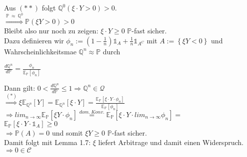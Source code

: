 \documentclass[envcountsame,envcountchap,envcountsect,amsart]{svmono}
\begin{document}
\begin{enumerate}
Aus $\left(**\right)$ folgt $\mathbb{Q}^0\left(\xi\cdot Y>0\right)>0$.\vspace*{.1cm}\\
$\stackrel{\mathbb{P}\ \approx\ \mathbb{Q}^0}\Longrightarrow \mathbb{P}\left(\xi Y>0\right)>0$\vspace*{.1cm}\\
Bleibt also nur noch zu zeigen: $\xi\cdot Y\geq 0$ $\mathbb{P}$-fast sicher.\vspace*{.1cm}\\
Dazu definieren wir $\phi_n:=\left(1-\frac{1}{n}\right)\mathds{1}_A+\frac{1}{n}\mathds{1}_{A^C}$ mit $A:=\left\{\xi Y< 0\right\}$ und Wahrscheinlichkeitsmae $\mathbb{Q}^n\approx\mathbb{P}$ durch
\begin{center}
$\frac{d\mathbb{Q}^n}{d\mathbb{P}}=\frac{\phi_n}{\mathbb{E}_{\mathbb{P}}\left[\phi_n\right]}$
\end{center}
Dann gilt: $0< \frac{d\mathbb{Q}^n}{d\mathbb{P}}\leq 1\Longrightarrow \mathbb{Q}^n\in\mathcal{Q}$\vspace*{.1cm}\\
$\stackrel{\left(*\right)}\Longrightarrow \xi\mathbb{E}_{\mathbb{Q}^n}\left[Y\right]=\mathbb{E}_{\mathbb{Q}^n}\left[\xi\cdot Y\right]=\frac{\mathbb{E}_{\mathbb{P}}\left[\xi\cdot Y\cdot \phi_n\right]}{\mathbb{E}_{\mathbb{P}}\left[ \phi_n\right]}$
\vspace*{.1cm}\\
$\Longrightarrow lim_{n\rightarrow\infty}\mathbb{E}_{\mathbb{P}}\left[\xi Y\cdot\phi_n\right]\stackrel{dom.\ Konv.}{=}\mathbb{E}_{\mathbb{P}}\left[\xi\cdot Y\cdot lim_{n\rightarrow\infty}\phi_n\right]=$\vspace*{.1cm}\\
$\mathbb{E}_{\mathbb{P}}\left[\xi\cdot Y\cdot\mathds{1}_A\right]\geq 0$\vspace*{.1cm}\\
$\Longrightarrow \mathbb{P}\left(A\right)=0$ und somit $\xi Y\geq 0$ $\mathbb{P}$-fast sicher.\vspace*{.1cm}\\
Damit folgt mit Lemma 1.7: $\xi$ liefert Arbitrage und damit einen Widerspruch.\vspace*{.1cm}\\
$\Rightarrow 0\in\mathcal{C}$
\end{enumerate}
\end{document}
